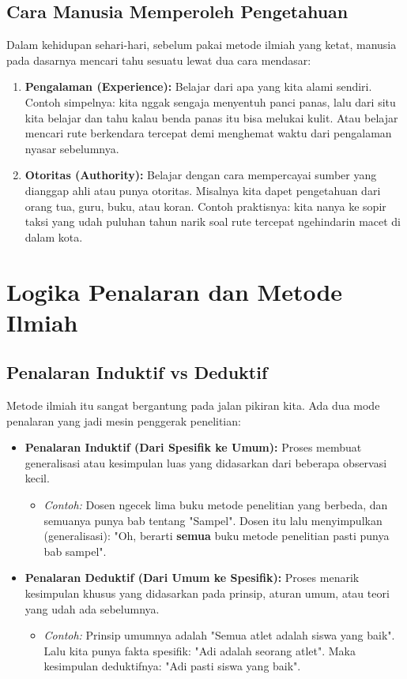 \documentclass[12pt,a4paper]{article}
\begin{document}
\subsection{Cara Manusia Memperoleh Pengetahuan}
Dalam kehidupan sehari-hari, sebelum pakai metode ilmiah yang ketat, manusia pada dasarnya mencari tahu sesuatu lewat dua cara mendasar:
\begin{enumerate}
    \item \textbf{Pengalaman (Experience):} Belajar dari apa yang kita alami sendiri. Contoh simpelnya: kita nggak sengaja menyentuh panci panas, lalu dari situ kita belajar dan tahu kalau benda panas itu bisa melukai kulit. Atau belajar mencari rute berkendara tercepat demi menghemat waktu dari pengalaman nyasar sebelumnya.
    \item \textbf{Otoritas (Authority):} Belajar dengan cara mempercayai sumber yang dianggap ahli atau punya otoritas. Misalnya kita dapet pengetahuan dari orang tua, guru, buku, atau koran. Contoh praktisnya: kita nanya ke sopir taksi yang udah puluhan tahun narik soal rute tercepat ngehindarin macet di dalam kota.
\end{enumerate}

\newpage
\section{Logika Penalaran dan Metode Ilmiah}

\subsection{Penalaran Induktif vs Deduktif}
Metode ilmiah itu sangat bergantung pada jalan pikiran kita. Ada dua mode penalaran yang jadi mesin penggerak penelitian:
\begin{itemize}
    \item \textbf{Penalaran Induktif (Dari Spesifik ke Umum):} Proses membuat generalisasi atau kesimpulan luas yang didasarkan dari beberapa observasi kecil. 
    \begin{itemize}
        \item \textit{Contoh:} Dosen ngecek lima buku metode penelitian yang berbeda, dan semuanya punya bab tentang "Sampel". Dosen itu lalu menyimpulkan (generalisasi): "Oh, berarti \textbf{semua} buku metode penelitian pasti punya bab sampel".
    \end{itemize}
    \item \textbf{Penalaran Deduktif (Dari Umum ke Spesifik):} Proses menarik kesimpulan khusus yang didasarkan pada prinsip, aturan umum, atau teori yang udah ada sebelumnya.
    \begin{itemize}
        \item \textit{Contoh:} Prinsip umumnya adalah "Semua atlet adalah siswa yang baik". Lalu kita punya fakta spesifik: "Adi adalah seorang atlet". Maka kesimpulan deduktifnya: "Adi pasti siswa yang baik".
    \end{itemize}
\end{itemize}
\end{document}
